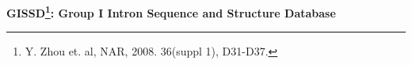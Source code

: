 \documentclass[landscape]{slides}
\begin{document}
\begin{slide}
\begin{center}
\small
\textbf{GISSD\footnote{Y. Zhou et. al, NAR, 2008. 36(suppl
    1), D31-D37.}: Group I Intron Sequence and Structure Database}
\end{center}



\vfill
\end{slide}
\end{document}
